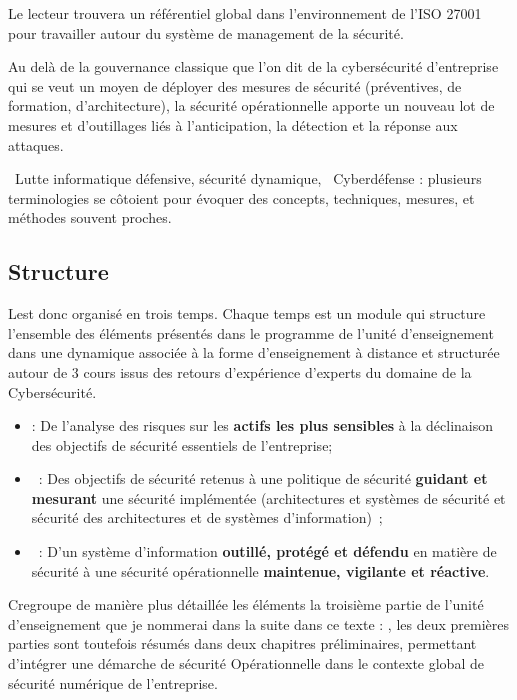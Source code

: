 Le lecteur trouvera un référentiel global dans l'environnement de l'ISO 27001 pour travailler autour du système de management de la sécurité.

Au delà de la gouvernance classique que l'on dit  de la cybersécurité d'entreprise qui se veut un moyen de déployer des mesures de sécurité (préventives, de formation, d'architecture), la sécurité opérationnelle apporte un nouveau lot de mesures et d'outillages liés à l'anticipation, la détection et la réponse aux attaques.

\begin{nota} Lutte informatique défensive, sécurité dynamique, 
Cyberdéfense : plusieurs terminologies se côtoient pour évoquer des concepts, techniques, mesures, et méthodes souvent proches. 
\end{nota}


\subsection{Structure}

L\ecours est donc organisé en trois temps. Chaque temps est un module qui structure l'ensemble des éléments présentés dans le programme de l'unité d'enseignement dans une dynamique associée à la forme d'enseignement à distance et structurée autour de 3 cours issus des retours d'expérience d'experts du domaine de la Cybersécurité.  
\begin{itemize}
\item {} : De l'analyse des risques sur les \textbf{actifs les plus sensibles} à la déclinaison des objectifs de sécurité essentiels de l'entreprise;
\item {} : Des objectifs de sécurité retenus à une politique de sécurité \textbf{guidant et mesurant }une sécurité implémentée (architectures et systèmes  de sécurité et sécurité des architectures et de systèmes d'information) ;
\item {} : D'un système d'information \textbf{outillé, protégé et défendu} en matière de sécurité à une sécurité opérationnelle \textbf{maintenue, vigilante et  réactive}.
\end{itemize}

C\edoc regroupe de manière plus détaillée les éléments la troisième partie de l'unité d'enseignement que je nommerai dans  la suite dans ce texte  : ,  les deux premières parties sont toutefois résumés dans deux chapitres préliminaires, permettant d'intégrer  une démarche de sécurité Opérationnelle dans le contexte global de sécurité numérique de l'entreprise.

